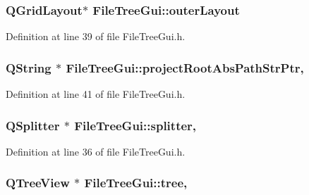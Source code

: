 \hypertarget{class_file_tree_gui_aaf8b63a4775b1d46d635cdaef94b979a}{
\subsubsection[{outer\-Layout}]{\setlength{\rightskip}{0pt plus 5cm}Q\-Grid\-Layout$\ast$ File\-Tree\-Gui\-::outer\-Layout\hspace{0.3cm}{\ttfamily [private]}}}\label{class_file_tree_gui_aaf8b63a4775b1d46d635cdaef94b979a}


Definition at line 39 of file File\-Tree\-Gui.\-h.

\hypertarget{class_file_tree_gui_a9ce991f8f95f583aa5fb1bec7a9bcd4c}{
\subsubsection[{project\-Root\-Abs\-Path\-Str\-Ptr}]{\setlength{\rightskip}{0pt plus 5cm}Q\-String $\ast$ File\-Tree\-Gui\-::project\-Root\-Abs\-Path\-Str\-Ptr\hspace{0.3cm}{\ttfamily [static]}, {\ttfamily [private]}}}\label{class_file_tree_gui_a9ce991f8f95f583aa5fb1bec7a9bcd4c}


Definition at line 41 of file File\-Tree\-Gui.\-h.

\hypertarget{class_file_tree_gui_a43e8677ba8c50059d003f298b631e131}{
\subsubsection[{splitter}]{\setlength{\rightskip}{0pt plus 5cm}Q\-Splitter $\ast$ File\-Tree\-Gui\-::splitter\hspace{0.3cm}{\ttfamily [static]}, {\ttfamily [private]}}}\label{class_file_tree_gui_a43e8677ba8c50059d003f298b631e131}


Definition at line 36 of file File\-Tree\-Gui.\-h.

\hypertarget{class_file_tree_gui_a157ed39f1e9a52c664d5372c65878f58}{
\subsubsection[{tree}]{\setlength{\rightskip}{0pt plus 5cm}Q\-Tree\-View $\ast$ File\-Tree\-Gui\-::tree\hspace{0.3cm}{\ttfamily [static]}, {\ttfamily [private]}}}\label{class_file_tree_gui_a157ed39f1e9a52c664d5372c65878f58}


